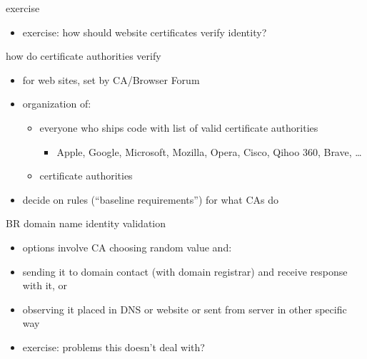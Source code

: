 \begin{frame}{exercise}
    \begin{itemize}
    \item exercise: how should website certificates verify identity?
    \end{itemize}
\end{frame}

\begin{frame}{how do certificate authorities verify}
    \begin{itemize}
        \item for web sites, set by CA/Browser Forum
        \item organization of:
            \begin{itemize}
            \item everyone who ships code with list of valid certificate authorities
                \begin{itemize}
                \item Apple, Google, Microsoft, Mozilla, Opera, Cisco, Qihoo 360, Brave, \ldots
                \end{itemize}
            \item certificate authorities
            \end{itemize}
        \item decide on rules (``baseline requirements'') for what CAs do
    \end{itemize}
\end{frame}

\begin{frame}{BR domain name identity validation}
    \begin{itemize}
        \item options involve CA choosing random value and:
        \vspace{.5cm}
        \item sending it to domain contact (with domain registrar) and receive response with it, or
        \item observing it placed in DNS or website or sent from server in other specific way
        \vspace{1cm}
        \item exercise: problems this doesn't deal with?
    \end{itemize}
\end{frame}

